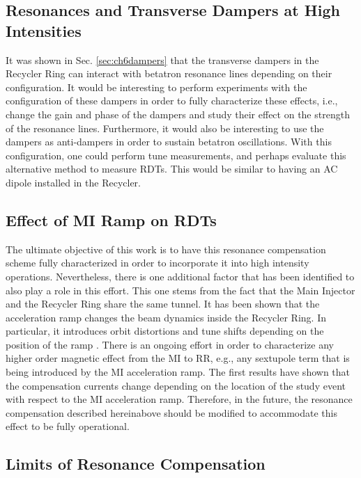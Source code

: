 \subsection{Resonances and Transverse Dampers at High Intensities}

It was shown in Sec. \ref{sec:ch6dampers} that the transverse dampers in the Recycler Ring can interact with betatron resonance lines depending on their configuration. It would be interesting to perform experiments with the configuration of these dampers in order to fully characterize these effects, i.e., change the gain and phase of the dampers and study their effect on the strength of the resonance lines. Furthermore, it would also be interesting to use the dampers as anti-dampers in order to sustain betatron oscillations. With this configuration, one could perform tune measurements, and perhaps evaluate this alternative method to measure RDTs. This would be similar to having an AC dipole installed in the Recycler.  

\subsection{Effect of MI Ramp on RDTs}

The ultimate objective of this work is to have this resonance compensation scheme fully characterized in order to incorporate it into high intensity operations. Nevertheless, there is one additional factor that has been identified to also play a role in this effort. This one stems from the fact that the Main Injector and the Recycler Ring share the same tunnel. It has been shown that the acceleration ramp changes the beam dynamics inside the Recycler Ring. In particular, it introduces orbit distortions and tune shifts depending on the position of the ramp \cite{mionrr}. There is an ongoing effort in order to characterize any higher order magnetic effect from the MI to RR, e.g., any sextupole term that is being introduced by the MI acceleration ramp. The first results have shown that the compensation currents change depending on the location of the study event with respect to the MI acceleration ramp. Therefore, in the future, the resonance compensation described hereinabove should be modified to accommodate this effect to be fully operational.

\subsection{Limits of Resonance Compensation}

